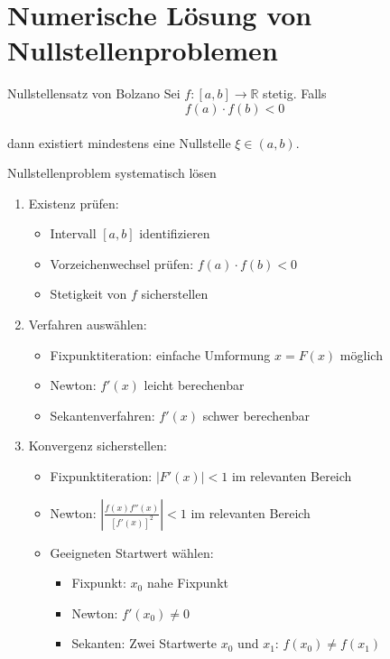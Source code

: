 \section{Numerische Lösung von Nullstellenproblemen}

\begin{lemma}{Nullstellensatz von Bolzano}
Sei $f:[a,b] \rightarrow \mathbb{R}$ stetig. Falls 
\vspace{-1mm}\\
$$f(a) \cdot f(b) < 0$$ 
\vspace{-3mm}\\
dann existiert mindestens eine Nullstelle $\xi \in (a,b)$.
\end{lemma}



\begin{KR}{Nullstellenproblem systematisch lösen}
\begin{enumerate}
    \item Existenz prüfen:
    \begin{itemize}
        \item Intervall $[a,b]$ identifizieren
        \item Vorzeichenwechsel prüfen: $f(a) \cdot f(b) < 0$ 
        \item Stetigkeit von $f$ sicherstellen
    \end{itemize}
    
    \item Verfahren auswählen:
    \begin{itemize}
        \item Fixpunktiteration: einfache Umformung $x = F(x)$ möglich
        \item Newton: $f'(x)$ leicht berechenbar
        \item Sekantenverfahren: $f'(x)$ schwer berechenbar
    \end{itemize}
    
    \item Konvergenz sicherstellen:
    \begin{itemize}
        \item Fixpunktiteration: $|F'(x)| < 1$ im relevanten Bereich
        \item Newton: $|\frac{f(x)f''(x)}{[f'(x)]^2}| < 1$ im relevanten Bereich
        \item Geeigneten Startwert wählen:
        \begin{itemize}
            \item Fixpunkt: $x_0$ nahe Fixpunkt
            \item Newton: $f'(x_0) \neq 0$
            \item Sekanten: Zwei Startwerte $x_0$ und $x_1$: $f(x_0) \neq f(x_1)$
        \end{itemize}
    \end{itemize}
    

\end{enumerate}
\end{KR}
